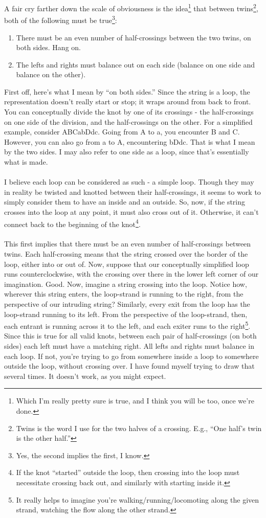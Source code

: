 \documentclass[twoside]{report}
\begin{document}
A fair cry farther down the scale of obviousness is the idea\footnote{Which I'm really pretty sure is true, and I think you will be too, once we're done.} that between twins\footnote{Twins is the word I use for the two halves of a crossing.  E.g., ``One half's twin is the other half.''}, both of the following must be true\footnote{Yes, the second implies the first, I know.}:
\begin{enumerate}
\item There must be an even number of half-crossings between the two twins, on both sides.  Hang on.
\item The lefts and rights must balance out on each side (balance on one side and balance on the other).
\end{enumerate}
First off, here's what I mean by ``on both sides.''  Since the string is a loop, the representation doesn't really start or stop; it wraps around from back to front.  You can conceptually divide the knot by one of its crossings - the half-crossings on one side of the division, and the half-crossings on the other.  For a simplified example, consider ABCabDdc.  Going from A to a, you encounter B and C.  However, you can also go from a to A, encountering bDdc.  That is what I mean by the two sides.  I may also refer to one side as a loop, since that's essentially what is made.\\\\
I believe each loop can be considered as such - a simple loop.  Though they may in reality be twisted and knotted between their half-crossings, it seems to work to simply consider them to have an inside and an outside.  So, now, if the string crosses into the loop at any point, it must also cross out of it.  Otherwise, it can't connect back to the beginning of the knot\footnote{If the knot ``started'' outside the loop, then crossing into the loop must necessitate crossing back out, and similarly with starting inside it.}.\\\\
This first implies that there must be an even number of half-crossings between twins.  Each half-crossing means that the string crossed over the border of the loop, either into or out of.  Now, suppose that our conceptually simplified loop runs counterclockwise, with the crossing over there in the lower left corner of our imagination.  Good.  Now, imagine a string crossing into the loop.  Notice how, wherever this string enters, the loop-strand is running to the right, from the perspective of our intruding string?  Similarly, every exit from the loop has the loop-strand running to its left.  From the perspective of the loop-strand, then, each entrant is running across it to the left, and each exiter runs to the right\footnote{It really helps to imagine you're walking/running/locomoting along the given strand, watching the flow along the other strand.}.  Since this is true for all valid knots, between each pair of half-crossings (on both sides) each left must have a matching right.  All lefts and rights must balance in each loop.  If not, you're trying to go from somewhere inside a loop to somewhere outside the loop, without crossing over.  I have found myself trying to draw that several times.  It doesn't work, as you might expect.
\end{document}
